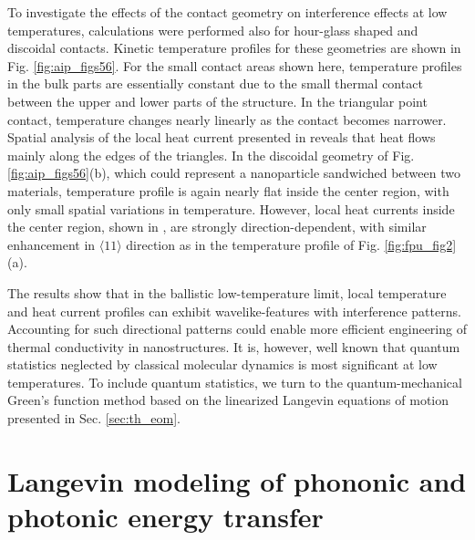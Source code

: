 To investigate the effects of the contact geometry on interference effects at low temperatures, calculations were performed also for hour-glass shaped and discoidal contacts. Kinetic temperature profiles for these geometries are shown in Fig. \ref{fig:aip_figs56}. For the small contact areas shown here, temperature profiles in the bulk parts are essentially constant due to the small thermal contact between the upper and lower parts of the structure. In the triangular point contact, temperature changes nearly linearly as the contact becomes narrower. Spatial analysis of the local heat current presented in  reveals that heat flows mainly along the edges of the triangles. In the discoidal geometry of Fig. \ref{fig:aip_figs56}(b), which could represent a nanoparticle sandwiched between two materials, temperature profile is again nearly flat inside the center region, with only small spatial variations in temperature. However, local heat currents inside the center region, shown in , are strongly direction-dependent, with similar enhancement in $\langle 11\rangle$ direction as in the temperature profile of Fig. \ref{fig:fpu_fig2}(a).

The results show that in the ballistic low-temperature limit, local temperature and heat current profiles can exhibit wavelike-features with interference patterns. Accounting for such directional patterns could enable more efficient engineering of thermal conductivity in nanostructures. It is, however, well known that quantum statistics neglected by classical molecular dynamics is most significant at low temperatures. To include quantum statistics, we turn to the quantum-mechanical Green's function method based on the linearized Langevin equations of motion presented in Sec. \ref{sec:th_eom}.

\section{Langevin modeling of phononic and photonic energy transfer}
\label{sec:results_gf}

